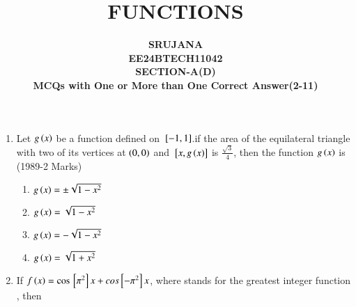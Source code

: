 \documentclass[journal,12pt,twocolumn]{IEEEtran}
\theoremstyle{remark}
\begin{document}

\vspace{3cm}

\title{\textbf{FUNCTIONS}}
\author{\textbf{SRUJANA\\EE24BTECH11042\\SECTION-A(D)\\MCQs with One or More than One Correct Answer(2-11)}}


\maketitle
\newpage
\bigskip

\renewcommand{\thefigure}{\theenumi}
\renewcommand{\thetable}{\theenmui}
\begin{enumerate}[start=2]
\item Let $g\left(x\right)$ be a function defined on ${}\left[-1,1\right]$.if the area of the equilateral triangle with two of its vertices at $\left(0,0\right)$ and ${}\left[x,g\left(x\right)\right]$ is $\frac{\sqrt{3}}{4}$, then the function $g\left(x\right)$ is
\hfill(1989-2 Marks)
\begin{multicols}{2}
\begin{enumerate} 
\item $g\left(x\right)=\pm\sqrt{1-x^2}$ 
\item $g\left(x\right)=\sqrt{1-x^2}$
\item $g\left(x\right)=-\sqrt{1-x^2}$
\item $g\left(x\right)=\sqrt{1+x^2}$
\end{enumerate}
\end{multicols}
\item If $f\left(x\right) = \cos{}\left[\pi^2\right]x + cos{}\left[-\pi^2\right]x$, where
 stands for the greatest integer function , then  


\end{enumerate}
\end{document}
